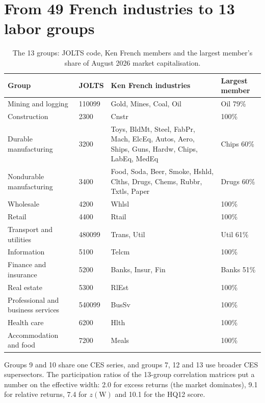 \section{From 49 French industries to 13 labor groups}\label{app:mapping}
\begin{table}[H]
\centering\footnotesize
\caption{The 13 groups: JOLTS code, Ken French members and the largest member's share of August 2026 market capitalisation. \hfill\tagc}
\begin{tabularx}{\textwidth}{@{}l l X l@{}}
\toprule
Group & JOLTS & Ken French industries & Largest member \\
\midrule
Mining and logging & 110099 & Gold, Mines, Coal, Oil & Oil 79\% \\ %
Construction & 2300 & Cnstr & 100\% \\
Durable manufacturing & 3200 & Toys, BldMt, Steel, FabPr, Mach, ElcEq, Autos, Aero, Ships, Guns, Hardw, Chips, LabEq, MedEq & Chips 60\% \\ %
Nondurable manufacturing & 3400 & Food, Soda, Beer, Smoke, Hshld, Clths, Drugs, Chems, Rubbr, Txtls, Paper & Drugs 60\% \\ %
Wholesale & 4200 & Whlsl & 100\% \\
Retail & 4400 & Rtail & 100\% \\
Transport and utilities & 480099 & Trans, Util & Util 61\% \\ %
Information & 5100 & Telcm & 100\% \\
Finance and insurance & 5200 & Banks, Insur, Fin & Banks 51\% \\ %
Real estate & 5300 & RlEst & 100\% \\
Professional and business services & 540099 & BusSv & 100\% \\
Health care & 6200 & Hlth & 100\% \\
Accommodation and food & 7200 & Meals & 100\% \\
\bottomrule
\end{tabularx}
\end{table}
Groups 9 and 10 share one CES series, and groups 7, 12 and 13 use broader CES supersectors. The participation ratios of the 13-group correlation matrices put a number on the effective width: 2.0 for excess returns (the market dominates), 9.1 for relative returns, 7.4 for $z(\text{W})$ and 10.1 for the HQ12 score. %

